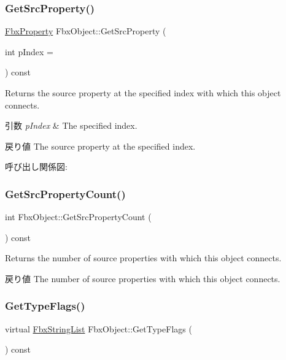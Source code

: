 \subsubsection{\texorpdfstring{Get\+Src\+Property()}{GetSrcProperty()}}
{\footnotesize\ttfamily \hyperlink{class_fbx_property}{Fbx\+Property} Fbx\+Object\+::\+Get\+Src\+Property (\begin{DoxyParamCaption}\item[{int}]{p\+Index = {} }\end{DoxyParamCaption}) const}

Returns the source property at the specified index with which this object connects. 
\begin{DoxyParams}{引数}
{\em p\+Index} & The specified index. \\
\hline
\end{DoxyParams}
\begin{DoxyReturn}{戻り値}
The source property at the specified index. 
\end{DoxyReturn}
呼び出し関係図\+:
\mbox{\label{class_fbx_object_a0c9680063d0f6771dd881cf3950337d6}} 
\subsubsection{\texorpdfstring{Get\+Src\+Property\+Count()}{GetSrcPropertyCount()}}
{\footnotesize\ttfamily int Fbx\+Object\+::\+Get\+Src\+Property\+Count (\begin{DoxyParamCaption}{ }\end{DoxyParamCaption}) const}

Returns the number of source properties with which this object connects. \begin{DoxyReturn}{戻り値}
The number of source properties with which this object connects. 
\end{DoxyReturn}
\mbox{\label{class_fbx_object_a6d30a5d00400039a248977cf9f9255b2}} 
\subsubsection{\texorpdfstring{Get\+Type\+Flags()}{GetTypeFlags()}}
{\footnotesize\ttfamily virtual \hyperlink{class_fbx_string_list}{Fbx\+String\+List} Fbx\+Object\+::\+Get\+Type\+Flags (\begin{DoxyParamCaption}{ }\end{DoxyParamCaption}) const\hspace{0.3cm}{\ttfamily [virtual]}}



